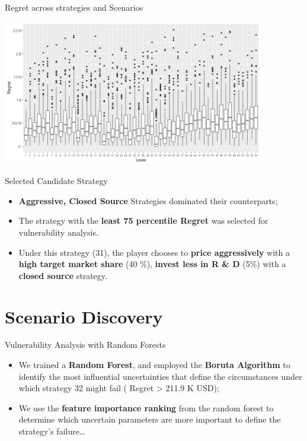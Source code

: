 \documentclass[12pt,ignorenonframetext,]{beamer}
\providecommand{\tightlist}{%
  \setlength{\itemsep}{0pt}\setlength{\parskip}{0pt}}
\begin{document}
\begin{frame}{Regret across strategies and Scenarios}
\protect\hypertarget{regret-across-strategies-and-scenarios}{}

\centerline{\includegraphics[height=2.5in]{images/regret-whisker.png}}

\end{frame}

\begin{frame}{Selected Candidate Strategy}
\protect\hypertarget{selected-candidate-strategy}{}

\begin{itemize}
\tightlist
\item
  \textbf{Aggressive, Closed Source} Strategies dominated their
  counterparts;
\item
  The strategy with the \textbf{least 75 percentile Regret} was selected
  for vulnerability analysis.
\item
  Under this strategy (31), the player chooses to \textbf{price
  aggressively} with a \textbf{high target market share} (40 \%),
  \textbf{invest less in R \& D} (5\%) with a \textbf{closed source}
  strategy.
\end{itemize}

\end{frame}

\hypertarget{scenario-discovery}{%
\section{Scenario Discovery}\label{scenario-discovery}}

\begin{frame}{Vulnerability Analysis with Random Forests}
\protect\hypertarget{vulnerability-analysis-with-random-forests}{}

\begin{itemize}
\item
  We trained a \textbf{Random Forest}, and employed the \textbf{Boruta
  Algorithm} to identify the most influential uncertainties that define
  the circumstances under which strategy 32 might fail ( Regret
  \textgreater{} 211.9 K USD);
\item
  We use the \textbf{feature importance ranking} from the random forest
  to determine which uncertain parameters are more important to define
  the strategy's failure\ldots{}
\end{itemize}

\end{frame}
\end{document}
